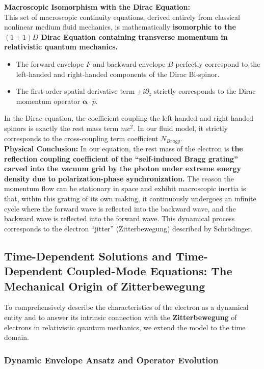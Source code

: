 \documentclass[12pt, a4paper]{article}
\begin{document}
\textbf{Macroscopic Isomorphism with the Dirac Equation:}\\
This set of macroscopic continuity equations, derived entirely from classical nonlinear medium fluid mechanics, is mathematically \textbf{isomorphic to the $(1+1)D$ Dirac Equation containing transverse momentum in relativistic quantum mechanics.}

\begin{itemize}
    \item The forward envelope $F$ and backward envelope $B$ perfectly correspond to the left-handed and right-handed components of the Dirac Bi-spinor.
    \item The first-order spatial derivative term $\pm i \partial_z$ strictly corresponds to the Dirac momentum operator $\boldsymbol{\alpha} \cdot \hat{p}$.
\end{itemize}

In the Dirac equation, the coefficient coupling the left-handed and right-handed spinors is exactly the rest mass term $mc^2$. In our fluid model, it strictly corresponds to the cross-coupling term coefficient $N_{Bragg}$.\\
\textbf{Physical Conclusion:} In our equation, the rest mass of the electron is \textbf{the reflection coupling coefficient of the ``self-induced Bragg grating'' carved into the vacuum grid by the photon under extreme energy density due to polarization-phase synchronization.} The reason the momentum flow can be stationary in space and exhibit macroscopic inertia is that, within this grating of its own making, it continuously undergoes an infinite cycle where the forward wave is reflected into the backward wave, and the backward wave is reflected into the forward wave. This dynamical process corresponds to the electron ``jitter'' (Zitterbewegung) described by Schr\"{o}dinger.

\subsection{Time-Dependent Solutions and Time-Dependent Coupled-Mode Equations: The Mechanical Origin of Zitterbewegung}

To comprehensively describe the characteristics of the electron as a dynamical entity and to answer its intrinsic connection with the \textbf{Zitterbewegung} of electrons in relativistic quantum mechanics, we extend the model to the time domain.

\subsubsection{Dynamic Envelope Ansatz and Operator Evolution}
\end{document}
